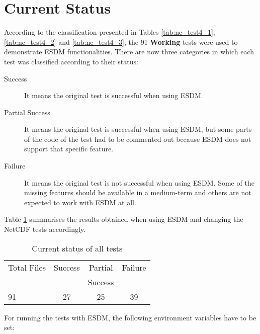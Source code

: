 \section{Current Status}

According to the classification presented in Tables \ref{tab:nc_test4_1}, \ref{tab:nc_test4_2} and \ref{tab:nc_test4_3}, the 91 {\bf Working} tests were used to demonstrate ESDM functionalities.
There are now three categories in which each test was classified according to their status:

\begin{description}

\item[Success] It means the original test is successful when using ESDM.

\item[Partial Success] It means the original test is successful when using ESDM, but some parts of the code of the test had to be commented out because ESDM does not support that specific feature.

\item[Failure] It means the original test is not successful when using ESDM.
Some of the missing features should be available in a medium-term and others are not expected to work with ESDM at all.

\end{description}

Table \ref{tab:nc_test4_status_3} summarises the results obtained when using ESDM and changing the NetCDF tests accordingly.

\begin{table}[H]
\centering
\begin{tabular}{|l|c|c|c|}
\hline
\multicolumn{1}{|c|}{Total Files} & \multicolumn{1}{c|}{Success} & \multicolumn{1}{c|}{Partial} & \multicolumn{1}{c|}{Failure} \\
                                  &                              & \multicolumn{1}{c|}{Success} &               \\ \hline \hline
91                                &     27                       &       25                     &       39      \\ \hline \hline
\end{tabular}
\caption{\label{tab:nc_test4_status_3} Current status of all tests}
\end{table}

For running the tests with ESDM, the following environment variables have to be set:

